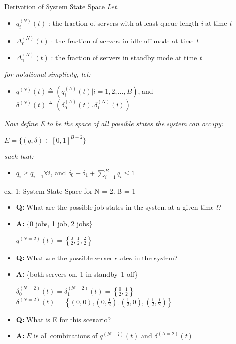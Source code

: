 \documentclass{beamer}
\begin{document}
\begin{frame}{Derivation of System State Space}
	\textit{Let:}
	\begin{itemize}
		\item $q_i^{(N)}(t)$ : the fraction of servers with  at least queue length \textit{i} at time \textit{t}
		\item $\Delta_0^{(N)}(t)$ : the fraction of servers in idle-off mode at time \textit{t}
		\item $\Delta_1^{(N)}(t)$ : the fraction of servers in standby mode at time \textit{t}
	\end{itemize}

	\textit{for notational simplicity, let:}
	\begin{itemize}
		\item $q^{(N)}(t) \triangleq (q_i^{(N)}(t)|i = 1,2, \ldots , B)$, and $\delta^{(N)}(t) \triangleq (\delta_0^{(N)}(t),\delta_1^{(N)}(t))$
	\end{itemize}
	\textit{Now define E to be the space of all possible states the system can occupy:}
	\begin{center}
		$E = \{(q,\delta) \in [0,1]^{B+2}\}$
	\end{center}
	\textit{such that:}
	\begin{itemize}\centering
		\item $q_i \geq q_{i+1} \forall i$, and $\delta_0 + \delta_1 + \sum_{i=1}^{B}q_i \leq 1$
	\end{itemize}
\end{frame}

\begin{frame}{ex. 1: System State Space for N = 2, B = 1}
	\begin{itemize}
		\item \textbf{Q: }What are the possible job states in the system at a given time \textit{t}?
		\item \textbf{A: }\{0 jobs, 1 job, 2 jobs\}
		      \begin{center}\centering
			      $q^{(N=2)}(t) = \left\{\frac{0}{2},\frac{1}{2},\frac{2}{2}\right\}$
		      \end{center}
		\item \textbf{Q: }What are the possible server states in the system?
		\item \textbf{A: }\{both servers on, 1 in standby, 1 off\}
		      \begin{center}
			      $\delta_0^{(N=2)}(t) = \delta_1^{(N=2)}(t) = \left\{\frac{0}{2},\frac{1}{2}\right\}$
			      $\delta^{(N=2)}(t) = \left\{(0,0),(0,\frac{1}{2}),(\frac{1}{2},0),(\frac{1}{2},\frac{1}{2}) \right\}$
		      \end{center}

		\item \textbf{Q: }What is E for this scenario?
		\item \textbf{A: }$E$ is all combinations of $q^{(N=2)}(t)$ and $\delta^{(N=2)}(t)$
	\end{itemize}

\end{frame}
\end{document}
